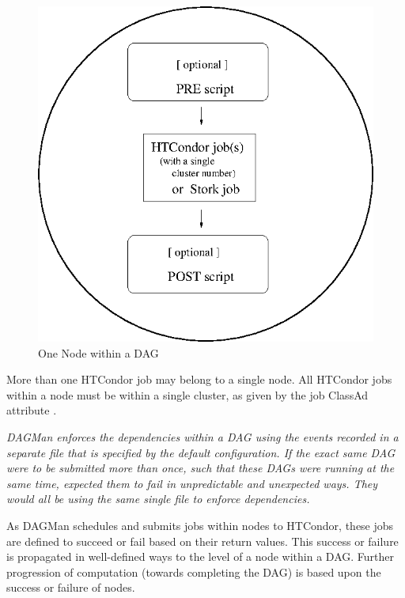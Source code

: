 \begin{figure}[hbt]
\centering
\includegraphics{user-man/dagman-node.eps}
\caption{\label{fig:dagman-node}One Node within a DAG}
\end{figure}

More than one HTCondor job may belong to a single node.
All HTCondor jobs within a node must be within
a single cluster, as given by the job ClassAd attribute .

\emph{DAGMan enforces the dependencies within a DAG
using the events recorded in a separate
file that is specified by the default configuration.
If the exact same DAG were to be submitted more than once,
such that these DAGs were running at the same time,
expected them to fail in unpredictable and unexpected ways.
They would all be using the same single file to enforce dependencies. }

As DAGMan schedules and submits jobs within nodes to HTCondor,
these jobs are defined to succeed or fail based on their
return values.
This success or failure is propagated in well-defined ways to the level of
a node within a DAG.
Further progression of computation
(towards completing the DAG)
is based upon the success or failure of nodes.


